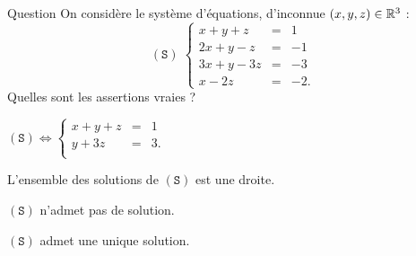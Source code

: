 \begin{multi}[multiple,feedback=
{\[(\mathtt{S}) \Leftrightarrow  \left\{\begin{array}{rcc}
x+y+z&=&1\\
y+3z&=&3.\\
\end{array}\right.\]
L'ensemble des solutions de \((\mathtt{S})\) est la droite : \(\{(-2+2z,3-3z,z)\, ; \; z \in \Rr\}\).
}]{Question}
On considère le système d'équations, d'inconnue \((x,y,z)\in \mathbb{R}^3\) :  
\[(\mathtt{S}) \; \left\{\begin{array}{rcc}
x+y+z&=&1\\
2x+y-z&=&-1\\ 
3x+y-3z&=&-3\\
x-2z&=&-2.\end{array}\right.\]
Quelles sont les assertions vraies ?

    \item* \((\mathtt{S}) \Leftrightarrow  \left\{\begin{array}{rcc}
x+y+z&=&1\\
y+3z&=&3.\\
\end{array}\right.\)
    \item* L'ensemble des solutions de \((\mathtt{S})\) est une droite.
    \item \((\mathtt{S})\) n'admet pas de solution.
    \item \((\mathtt{S})\) admet une unique solution.
\end{multi}


